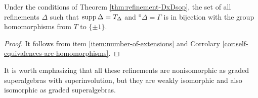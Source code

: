     
    

\begin{cor}\label{cor:old-item-iv}
    Under the conditions of Theorem \ref{thm:refinement-DxDsop}, the set of all refinements $\Delta$ such that $\operatorname{supp} \Delta = T_\Delta$ and ${}^\pi \Delta = \Gamma$ is in bijection with the group homomorphisms from $T$ to $\{ \pm 1 \}$.
\end{cor}

\begin{proof}
    It follows from item \eqref{item:number-of-extensions} and Corrolary \ref{cor:self-equivalences-are-homomorphisms}.
\end{proof}

It is worth emphasizing that all these refinements are nonisomorphic as graded superalgebras with superinvolution, but they are weakly isomorphic and also isomorphic as graded superalgebras. 



